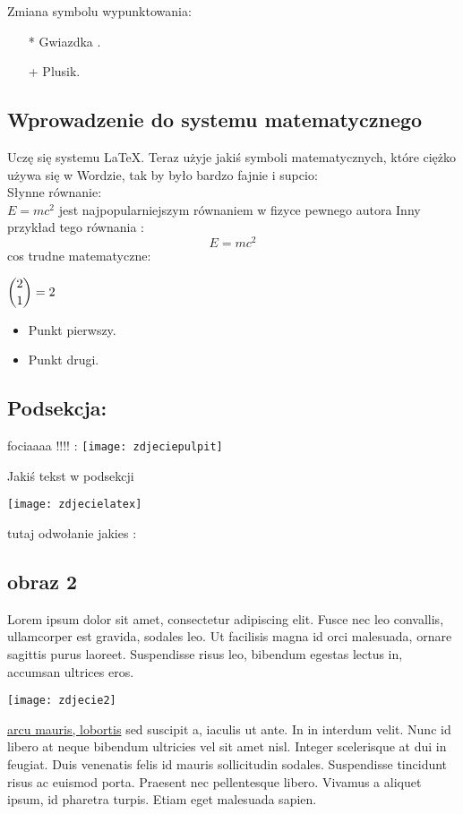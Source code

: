\documentclass[12pt,a4paper]{article}
\begin{document}
Zmiana symbolu wypunktowania: 
\begin{itemize}
    \item[*] Gwiazdka .
    \item[+] Plusik.
\end{itemize}

\subsection{Wprowadzenie do systemu matematycznego}
Uczę się systemu \LaTeX. Teraz użyje jakiś symboli matematycznych, które ciężko używa się w Wordzie, tak by było bardzo fajnie i supcio: \\
Słynne równanie:  \\
$E = mc^2$ 
jest najpopularniejszym równaniem w fizyce pewnego autora
Inny przykład tego równania : 
$$E = mc^2$$ 
cos trudne matematyczne: 


$\dbinom{2}{1} = 2$
\begin{itemize}
    \item Punkt pierwszy.
    \item Punkt drugi.
\end{itemize}
\subsection{Podsekcja:}
fociaaaa !!!! : 
\texttt{[image: zdjeciepulpit]}

Jakiś tekst w podsekcji


\texttt{[image: zdjecielatex]}

tutaj odwołanie jakies :


\subsection{obraz 2}


 Lorem ipsum dolor sit amet, consectetur adipiscing elit. Fusce nec leo convallis, ullamcorper est gravida, sodales leo. Ut facilisis magna id orci malesuada, ornare sagittis purus laoreet. Suspendisse risus leo, bibendum egestas lectus in, accumsan ultrices eros. 

\texttt{[image: zdjecie2]} 


\underline{ arcu mauris, lobortis} sed suscipit a, iaculis ut ante. In in interdum velit. Nunc id libero at neque bibendum ultricies vel sit amet nisl. Integer scelerisque at dui in feugiat. Duis venenatis felis id mauris sollicitudin sodales. Suspendisse tincidunt risus ac euismod porta. Praesent nec pellentesque libero. Vivamus a aliquet ipsum, id pharetra turpis. Etiam eget malesuada sapien.
\end{document}
